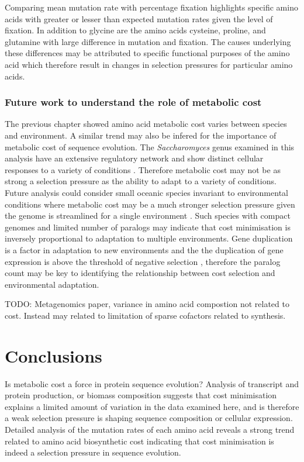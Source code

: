Comparing mean mutation rate with percentage fixation highlights specific amino acids with greater or lesser than expected mutation rates given the level of fixation. In addition to glycine are the amino acids cysteine, proline, and glutamine with large difference in mutation and fixation. The causes underlying these differences may be attributed to specific functional purposes of the amino acid which therefore result in changes in selection pressures for particular amino acids.

\subsubsection{Future work to understand the role of metabolic cost}

The previous chapter showed amino acid metabolic cost varies between species and environment. A similar trend may also be infered for the importance of metabolic cost of sequence evolution. The \emph{Saccharomyces} genus examined in this analysis have an extensive regulatory network and show distinct cellular responses to a variety of conditions \cite{castrillo2007}. Therefore metabolic cost may not be as strong a selection pressure as the ability to adapt to a variety of conditions. Future analysis could consider small oceanic species invariant to environmental conditions where metabolic cost may be a much stronger selection pressure given the genome is streamlined for a single environment \cite{peligabacter}. Such species with compact genomes and limited number of paralogs may indicate that cost minimisation is inversely proportional to adaptation to multiple environments. Gene duplication is a factor in adaptation to new environments \cite{ryan,envirologs} and the the duplication of gene expression is above the threshold of negative selection \cite{swire2007}, therefore the paralog count may be key to identifying the relationship between cost selection and environmental adaptation.

TODO: Metagenomics paper, variance in amino acid compostion not related to cost. Instead may related to limitation of sparse cofactors related to synthesis.

\section{Conclusions}

Is metabolic cost a force in protein sequence evolution? Analysis of transcript and protein production, or biomass composition suggests that cost minimisation explains a limited amount of variation in the data examined here, and is therefore a weak selection pressure is shaping sequence composition or cellular expression. Detailed analysis of the mutation rates of each amino acid reveals a strong trend related to amino acid biosynthetic cost indicating that cost minimisation is indeed a selection pressure in sequence evolution.
